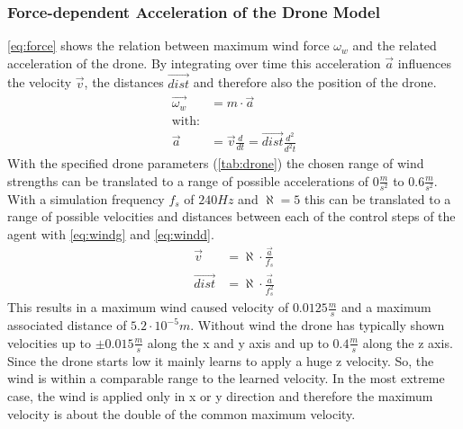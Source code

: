 \subsubsection*{Force-dependent Acceleration of the Drone Model}
\cref{eq:force} shows the relation between maximum wind force $\omega_w$ and the related acceleration
of the drone. By integrating over time this acceleration $\overrightarrow{a}$ influences 
the velocity $\overrightarrow{v}$, the distances $\overrightarrow{dist}$ and therefore also 
the position of the drone.
\begin{align}
	\overrightarrow{\omega_w} &= m \cdot \overrightarrow{a} \label{eq:force}\\
	\text{with:} &\nonumber\\
	\overrightarrow{a} &= \overrightarrow{v} \frac{d}{dt} = \overrightarrow{dist} \frac{d^2}{d^2t}
\end{align}
With the specified drone parameters (\cref{tab:drone}) the chosen range of wind strengths can 
be translated to a range of possible accelerations of $0 \frac{m}{s^2}$ to $0.6 \frac{m}{s^2}$.
With a simulation frequency $f_s$ of $240Hz$ and $\aleph = 5$ this can be translated to a range
of possible velocities and distances between each of the control steps of the agent with \cref{eq:windg} 
and \cref{eq:windd}.
\begin{align}
	\overrightarrow{v} &= \aleph \cdot \frac{\overrightarrow{a}}{f_s} \label{eq:windg}\\
	\overrightarrow{dist} &= \aleph \cdot \frac{\overrightarrow{a}}{f_s^2} \label{eq:windd}
\end{align}
This results in a maximum wind caused velocity of $0.0125 \frac{m}{s}$ and a maximum
associated distance of $5.2 \cdot 10^{-5} m$.
Without wind the drone has typically shown velocities up to $\pm 0.015 \frac{m}{s}$
along the x and y axis and up to $0.4 \frac{m}{s}$ along the z axis.
Since the drone starts low it mainly learns to apply a huge z velocity.
So, the wind is within a comparable range to the learned velocity.
In the most extreme case, the wind is applied only in x or y direction and
therefore the maximum velocity is about the double of the common maximum velocity.

